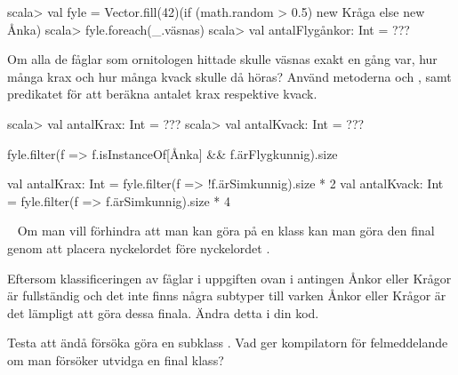 \begin{REPL}
scala> val fyle =
         Vector.fill(42)(if (math.random > 0.5) new Kråga else new Ånka)
scala> fyle.foreach(_.väsnas)
scala> val antalFlygånkor: Int = ???
\end{REPL}

\Subtask \label{subtask:fyle:sound} Om alla de fåglar som ornitologen hittade skulle väsnas exakt en gång var, hur många krax och hur många kvack skulle då höras? Använd metoderna  och , samt predikatet  för att beräkna antalet krax respektive kvack.
\begin{REPL}
scala> val antalKrax: Int = ???
scala> val antalKvack: Int = ???
\end{REPL}

\SOLUTION


\TaskSolved \what


\SubtaskSolved
\begin{Code}
fyle.filter(f => f.isInstanceOf[Ånka] && f.ärFlygkunnig).size
\end{Code}

\SubtaskSolved
\begin{Code}
val antalKrax: Int = fyle.filter(f => !f.ärSimkunnig).size * 2
val antalKvack: Int = fyle.filter(f => f.ärSimkunnig).size * 4
\end{Code}


\QUESTEND












\QUESTBEGIN

\Task  \what~  Om man vill förhindra att man kan göra  på en klass kan man göra den final genom att placera nyckelordet  före nyckelordet .

\Subtask Eftersom klassificeringen av fåglar i uppgiften ovan i antingen Ånkor eller Krågor är fullständig och det inte finns några subtyper till varken Ånkor eller Krågor är det lämpligt att göra dessa finala. Ändra detta i din kod.

\Subtask Testa att ändå försöka göra en subklass . Vad ger kompilatorn för felmeddelande om man försöker utvidga en final klass?


\SOLUTION


\TaskSolved \what


